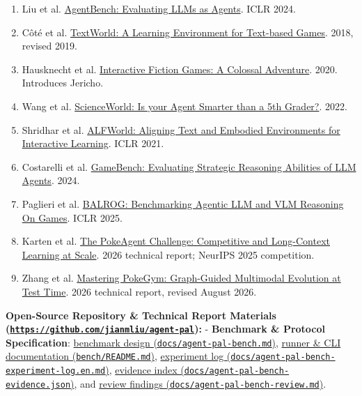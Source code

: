 \documentclass[11pt,a4paper]{article}
\begin{document}
\begin{enumerate}
\item Liu et al. \href{https://arxiv.org/abs/2308.03688}{AgentBench: Evaluating LLMs as Agents}. ICLR 2024.
\item Côté et al. \href{https://arxiv.org/abs/1806.11532}{TextWorld: A Learning Environment for Text-based Games}. 2018, revised 2019.
\item Hausknecht et al. \href{https://arxiv.org/abs/1909.05398}{Interactive Fiction Games: A Colossal Adventure}. 2020. Introduces Jericho.
\item Wang et al. \href{https://arxiv.org/abs/2203.07540}{ScienceWorld: Is your Agent Smarter than a 5th Grader?}. 2022.
\item Shridhar et al. \href{https://arxiv.org/abs/2010.03768}{ALFWorld: Aligning Text and Embodied Environments for Interactive Learning}. ICLR 2021.
\item Costarelli et al. \href{https://arxiv.org/abs/2406.06613}{GameBench: Evaluating Strategic Reasoning Abilities of LLM Agents}. 2024.
\item Paglieri et al. \href{https://arxiv.org/abs/2411.13543}{BALROG: Benchmarking Agentic LLM and VLM Reasoning On Games}. ICLR 2025.
\item Karten et al. \href{https://arxiv.org/abs/2603.15563}{The PokeAgent Challenge: Competitive and Long-Context Learning at Scale}. 2026 technical report; NeurIPS 2025 competition.
\item Zhang et al. \href{https://arxiv.org/abs/2604.08340v2}{Mastering PokeGym: Graph-Guided Multimodal Evolution at Test Time}. 2026 technical report, revised August 2026.

\end{enumerate}
\textbf{Open-Source Repository \& Technical Report Materials (\href{https://github.com/jianmliu/agent-pal}{\nolinkurl{https://github.com/jianmliu/agent-pal}}):}
- \textbf{Benchmark \& Protocol Specification}: \href{./agent-pal-bench.md}{benchmark design (\texttt{docs\allowbreak{}/\allowbreak{}agent\allowbreak{}-\allowbreak{}pal\allowbreak{}-\allowbreak{}bench\allowbreak{}.\allowbreak{}md})}, \href{../bench/README.md}{runner \& CLI documentation (\texttt{bench\allowbreak{}/\allowbreak{}README\allowbreak{}.\allowbreak{}md})}, \href{./agent-pal-bench-experiment-log.en.md}{experiment log (\texttt{docs\allowbreak{}/\allowbreak{}agent\allowbreak{}-\allowbreak{}pal\allowbreak{}-\allowbreak{}bench\allowbreak{}-\allowbreak{}experiment\allowbreak{}-\allowbreak{}log\allowbreak{}.\allowbreak{}en\allowbreak{}.\allowbreak{}md})}, \href{./agent-pal-bench-evidence.json}{evidence index (\texttt{docs\allowbreak{}/\allowbreak{}agent\allowbreak{}-\allowbreak{}pal\allowbreak{}-\allowbreak{}bench\allowbreak{}-\allowbreak{}evidence\allowbreak{}.\allowbreak{}json})}, and \href{./agent-pal-bench-review.md}{review findings (\texttt{docs\allowbreak{}/\allowbreak{}agent\allowbreak{}-\allowbreak{}pal\allowbreak{}-\allowbreak{}bench\allowbreak{}-\allowbreak{}review\allowbreak{}.\allowbreak{}md})}.
\end{document}
